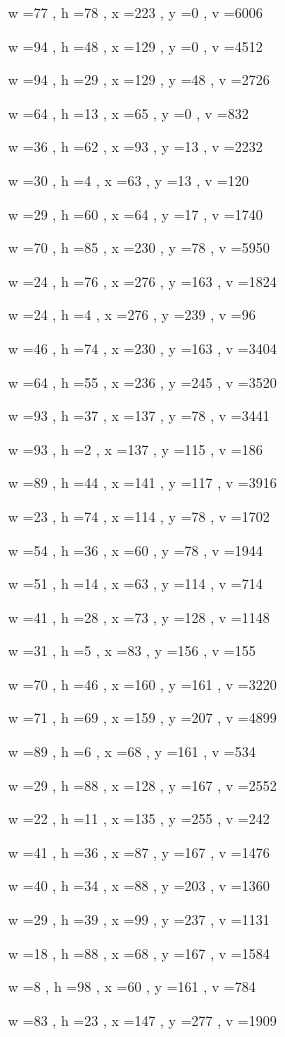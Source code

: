 \documentclass[11pt]{article}
\begin{document}
w =77 , h =78 , x =223 , y =0 , v =6006
\par
w =94 , h =48 , x =129 , y =0 , v =4512
\par
w =94 , h =29 , x =129 , y =48 , v =2726
\par
w =64 , h =13 , x =65 , y =0 , v =832
\par
w =36 , h =62 , x =93 , y =13 , v =2232
\par
w =30 , h =4 , x =63 , y =13 , v =120
\par
w =29 , h =60 , x =64 , y =17 , v =1740
\par
w =70 , h =85 , x =230 , y =78 , v =5950
\par
w =24 , h =76 , x =276 , y =163 , v =1824
\par
w =24 , h =4 , x =276 , y =239 , v =96
\par
w =46 , h =74 , x =230 , y =163 , v =3404
\par
w =64 , h =55 , x =236 , y =245 , v =3520
\par
w =93 , h =37 , x =137 , y =78 , v =3441
\par
w =93 , h =2 , x =137 , y =115 , v =186
\par
w =89 , h =44 , x =141 , y =117 , v =3916
\par
w =23 , h =74 , x =114 , y =78 , v =1702
\par
w =54 , h =36 , x =60 , y =78 , v =1944
\par
w =51 , h =14 , x =63 , y =114 , v =714
\par
w =41 , h =28 , x =73 , y =128 , v =1148
\par
w =31 , h =5 , x =83 , y =156 , v =155
\par
w =70 , h =46 , x =160 , y =161 , v =3220
\par
w =71 , h =69 , x =159 , y =207 , v =4899
\par
w =89 , h =6 , x =68 , y =161 , v =534
\par
w =29 , h =88 , x =128 , y =167 , v =2552
\par
w =22 , h =11 , x =135 , y =255 , v =242
\par
w =41 , h =36 , x =87 , y =167 , v =1476
\par
w =40 , h =34 , x =88 , y =203 , v =1360
\par
w =29 , h =39 , x =99 , y =237 , v =1131
\par
w =18 , h =88 , x =68 , y =167 , v =1584
\par
w =8 , h =98 , x =60 , y =161 , v =784
\par
w =83 , h =23 , x =147 , y =277 , v =1909
\end{document}
